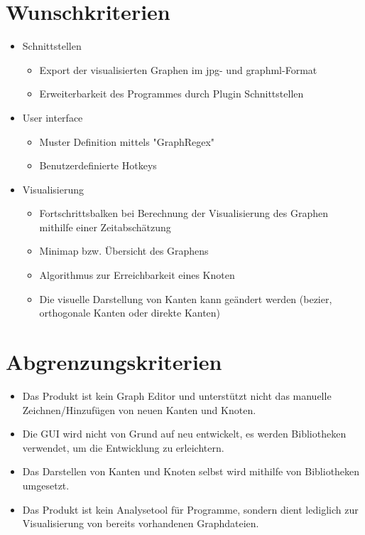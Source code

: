 \section{Wunschkriterien}

\begin{itemize}
\item Schnittstellen
\begin{itemize}
\item Export der visualisierten Graphen im \gls{jpg}- und \gls{graphml}-Format
\item Erweiterbarkeit des Programmes durch Plugin Schnittstellen
\end{itemize}
\item User interface
\begin{itemize}
\item Muster Definition mittels "GraphRegex"
\item Benutzerdefinierte Hotkeys
\end{itemize}
\item Visualisierung
\begin{itemize}
\item Fortschrittsbalken bei Berechnung der Visualisierung des Graphen mithilfe einer Zeitabschätzung
\item Minimap bzw. Übersicht des Graphens
\item Algorithmus zur Erreichbarkeit eines Knoten
\item Die visuelle Darstellung von Kanten kann geändert werden (\gls{bezier}, orthogonale Kanten oder direkte Kanten)
\end{itemize}
\end{itemize}

\section{Abgrenzungskriterien}

\begin{itemize}
\item Das Produkt ist kein Graph Editor und unterstützt nicht das manuelle Zeichnen/Hinzufügen von neuen Kanten und Knoten.
\item Die GUI wird nicht von Grund auf neu entwickelt, es werden Bibliotheken verwendet, um die Entwicklung zu erleichtern. 
\item Das Darstellen von Kanten und Knoten selbst wird mithilfe von Bibliotheken umgesetzt.
\item Das Produkt ist kein Analysetool für Programme, sondern dient lediglich zur Visualisierung von bereits vorhandenen Graphdateien.
\end{itemize}